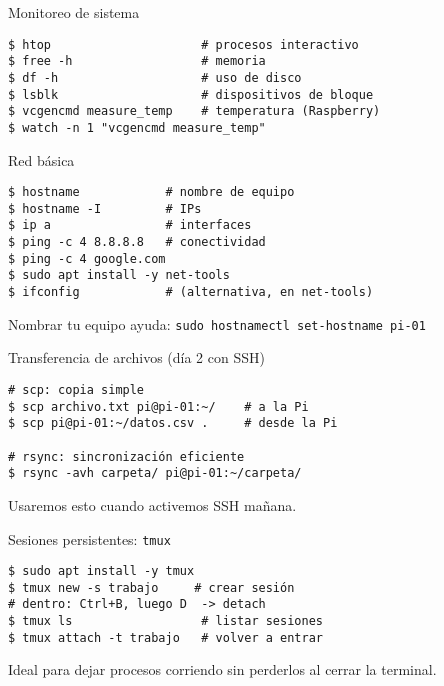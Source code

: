 \documentclass[aspectratio=169,professionalfonts]{beamer}
\begin{document}
\begin{frame}[fragile]{Monitoreo de sistema}
\begin{verbatim}
$ htop                     # procesos interactivo
$ free -h                  # memoria
$ df -h                    # uso de disco
$ lsblk                    # dispositivos de bloque
$ vcgencmd measure_temp    # temperatura (Raspberry)
$ watch -n 1 "vcgencmd measure_temp"
\end{verbatim}
\end{frame}

\begin{frame}[fragile]{Red básica}
\begin{verbatim}
$ hostname            # nombre de equipo
$ hostname -I         # IPs
$ ip a                # interfaces
$ ping -c 4 8.8.8.8   # conectividad
$ ping -c 4 google.com
$ sudo apt install -y net-tools
$ ifconfig            # (alternativa, en net-tools)
\end{verbatim}
\begin{infobox}
Nombrar tu equipo ayuda: \texttt{sudo hostnamectl set-hostname pi-01}
\end{infobox}
\end{frame}

\begin{frame}[fragile]{Transferencia de archivos (día 2 con SSH)}
\begin{verbatim}
# scp: copia simple
$ scp archivo.txt pi@pi-01:~/    # a la Pi
$ scp pi@pi-01:~/datos.csv .     # desde la Pi

# rsync: sincronización eficiente
$ rsync -avh carpeta/ pi@pi-01:~/carpeta/
\end{verbatim}
\begin{infobox}
Usaremos esto cuando activemos SSH mañana.
\end{infobox}
\end{frame}

\begin{frame}[fragile]{Sesiones persistentes: \texttt{tmux}}
\begin{verbatim}
$ sudo apt install -y tmux
$ tmux new -s trabajo     # crear sesión
# dentro: Ctrl+B, luego D  -> detach
$ tmux ls                  # listar sesiones
$ tmux attach -t trabajo   # volver a entrar
\end{verbatim}
\begin{infobox}
Ideal para dejar procesos corriendo sin perderlos al cerrar la terminal.
\end{infobox}
\end{frame}
\end{document}
